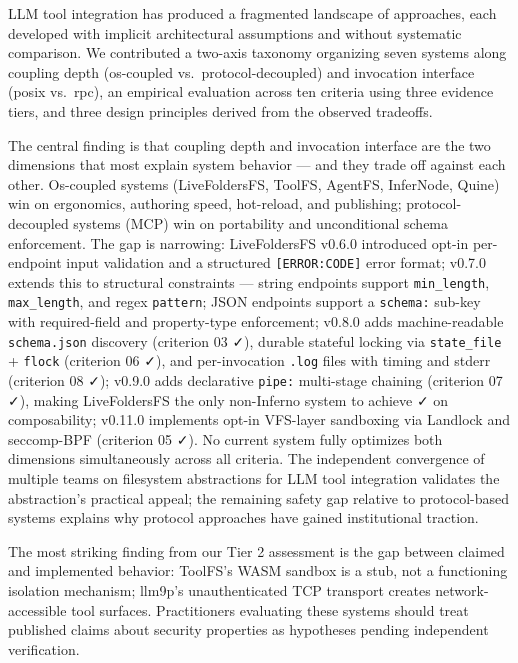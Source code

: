 \documentclass[
  11pt,
]{article}
\begin{document}
LLM tool integration has produced a fragmented landscape of approaches,
each developed with implicit architectural assumptions and without
systematic comparison. We contributed a two-axis taxonomy organizing
seven systems along coupling depth (os-coupled vs.~protocol-decoupled)
and invocation interface (posix vs.~rpc), an empirical evaluation across
ten criteria using three evidence tiers, and three design principles
derived from the observed tradeoffs.

The central finding is that coupling depth and invocation interface are
the two dimensions that most explain system behavior --- and they trade
off against each other. Os-coupled systems (LiveFoldersFS, ToolFS,
AgentFS, InferNode, Quine) win on ergonomics, authoring speed,
hot-reload, and publishing; protocol-decoupled systems (MCP) win on
portability and unconditional schema enforcement. The gap is narrowing:
LiveFoldersFS v0.6.0 introduced opt-in per-endpoint input validation and
a structured \texttt{{[}ERROR:CODE{]}} error format; v0.7.0 extends this
to structural constraints --- string endpoints support
\texttt{min\_length}, \texttt{max\_length}, and regex \texttt{pattern};
JSON endpoints support a \texttt{schema:} sub-key with required-field
and property-type enforcement; v0.8.0 adds machine-readable
\texttt{schema.json} discovery (criterion 03 ✓), durable stateful
locking via \texttt{state\_file} + \texttt{flock} (criterion 06 ✓), and
per-invocation \texttt{.log} files with timing and stderr (criterion 08
✓); v0.9.0 adds declarative \texttt{pipe:} multi-stage chaining
(criterion 07 ✓), making LiveFoldersFS the only non-Inferno system to
achieve ✓ on composability; v0.11.0 implements opt-in VFS-layer
sandboxing via Landlock and seccomp-BPF (criterion 05 ✓). No current
system fully optimizes both dimensions simultaneously across all
criteria. The independent convergence of multiple teams on filesystem
abstractions for LLM tool integration validates the abstraction's
practical appeal; the remaining safety gap relative to protocol-based
systems explains why protocol approaches have gained institutional
traction.

The most striking finding from our Tier 2 assessment is the gap between
claimed and implemented behavior: ToolFS's WASM sandbox is a stub, not a
functioning isolation mechanism; llm9p's unauthenticated TCP transport
creates network-accessible tool surfaces. Practitioners evaluating these
systems should treat published claims about security properties as
hypotheses pending independent verification.
\end{document}
